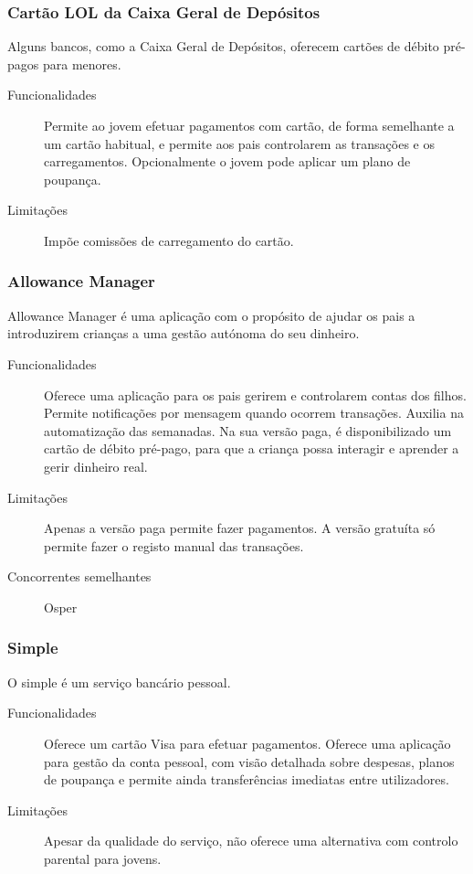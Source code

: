 \documentclass{article}
\begin{document}
    \subsubsection{Cartão LOL da Caixa Geral de Depósitos}

      Alguns bancos, como a Caixa Geral de Depósitos, oferecem cartões de débito pré-pagos para menores.

      \begin{description}
        \item[Funcionalidades] Permite ao jovem efetuar pagamentos com cartão, de forma semelhante a um cartão habitual, e permite aos pais controlarem as transações e os carregamentos. Opcionalmente o jovem pode aplicar um plano de poupança.
        \item[Limitações]Impõe comissões de carregamento do cartão.
      \end{description}


    \subsubsection{Allowance Manager}

      Allowance Manager é uma aplicação com o propósito de ajudar os pais a introduzirem crianças a uma gestão autónoma do seu dinheiro.

      \begin{description}
        \item[Funcionalidades]Oferece uma aplicação para os pais gerirem e controlarem contas dos filhos. Permite notificações por mensagem quando ocorrem transações. Auxilia na automatização das semanadas. Na sua versão paga, é disponibilizado um cartão de débito pré-pago, para que a criança possa interagir e aprender a gerir dinheiro real.
        \item[Limitações]Apenas a versão paga permite fazer pagamentos. A versão gratuíta só permite fazer o registo manual das transações.
        \item[Concorrentes semelhantes]Osper
      \end{description}
      
    \subsubsection{Simple}

      O simple é um serviço bancário pessoal.

      \begin{description}
        \item[Funcionalidades]Oferece um cartão Visa para efetuar pagamentos. Oferece uma aplicação para gestão da conta pessoal, com visão detalhada sobre despesas, planos de poupança e permite ainda transferências imediatas entre utilizadores.
        \item[Limitações]Apesar da qualidade do serviço, não oferece uma alternativa com controlo parental para jovens.
      \end{description}
      
\end{document}
